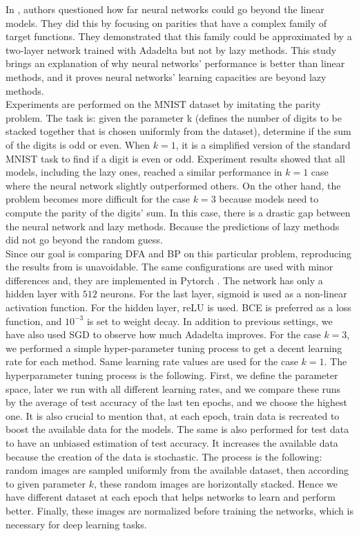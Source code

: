\documentclass[a4paper, nobind]{templates/ociamthesis}
\begin{document}
In \cite{DBLP:journals/corr/abs-2002-07400}, authors questioned how far neural networks could go beyond the linear models. They did this by focusing on parities that have a complex family of target functions. They demonstrated that this family could be approximated by a two-layer network trained with Adadelta but not by lazy methods. This study brings an explanation of why neural networks' performance is better than linear methods, and it proves neural networks' learning capacities are beyond lazy methods.\\
Experiments are performed on the MNIST dataset by imitating the parity problem. The task is: given the parameter k (defines the number of digits to be stacked together that is chosen uniformly from the dataset), determine if the sum of the digits is odd or even. When \(k=1\), it is a simplified version of the standard MNIST task to find if a digit is even or odd. Experiment results showed that all models, including the lazy ones, reached a similar performance in \(k=1\) case where the neural network slightly outperformed others. On the other hand, the problem becomes more difficult for the case \(k=3\) because models need to compute the parity of the digits' sum. In this case, there is a drastic gap between the neural network and lazy methods. Because the predictions of lazy methods did not go beyond the random guess.\\
Since our goal is comparing DFA and BP on this particular problem, reproducing the results from \cite{DBLP:journals/corr/abs-2002-07400} is unavoidable. The same configurations are used with minor differences and, they are implemented in Pytorch \cite{NEURIPS2019_9015}. The network has only a hidden layer with \(512\) neurons. For the last layer, sigmoid is used as a non-linear activation function. For the hidden layer, reLU is used. BCE is preferred as a loss function, and \(10^{-3}\) is set to weight decay. In addition to previous settings, we have also used SGD to observe how much Adadelta improves. For the case \(k=3\), we performed a simple hyper-parameter tuning process to get a decent learning rate for each method. Same learning rate values are used for the case \(k=1\). The hyperparameter tuning process is the following. First, we define the parameter space, later we run with all different learning rates, and we compare these runs by the average of test accuracy of the last ten epochs, and we choose the highest one. It is also crucial to mention that, at each epoch, train data is recreated to boost the available data for the models. The same is also performed for test data to have an unbiased estimation of test accuracy. It increases the available data because the creation of the data is stochastic. The process is the following: random images are sampled uniformly from the available dataset, then according to given parameter \(k\), these random images are horizontally stacked. Hence we have different dataset at each epoch that helps networks to learn and perform better. Finally, these images are normalized before training the networks, which is necessary for deep learning tasks.
\end{document}
